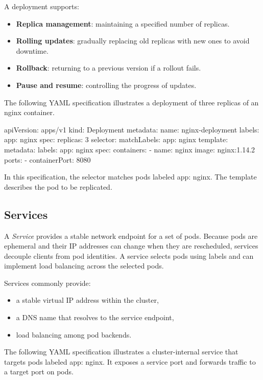 \documentclass[11pt,a4paper,openany]{report}
\begin{document}
A deployment supports:

\begin{itemize}
\item \textbf{Replica management}: maintaining a specified number of replicas.
\item \textbf{Rolling updates}: gradually replacing old replicas with new ones to avoid downtime.
\item \textbf{Rollback}: returning to a previous version if a rollout fails.
\item \textbf{Pause and resume}: controlling the progress of updates.
\end{itemize}

The following YAML specification illustrates a deployment of three replicas of an nginx container.

\begin{codeblock}
apiVersion: apps/v1
kind: Deployment
metadata:
  name: nginx-deployment
  labels:
    app: nginx
spec:
  replicas: 3
  selector:
    matchLabels:
      app: nginx
  template:
    metadata:
      labels:
        app: nginx
    spec:
      containers:
        - name: nginx
          image: nginx:1.14.2
          ports:
            - containerPort: 8080
\end{codeblock}

In this specification, the selector matches pods labeled app: nginx. The template describes the pod to be replicated.

\subsection{Services}

A \emph{Service} provides a stable network endpoint for a set of pods. Because pods are ephemeral and their IP addresses can change when they are rescheduled, services decouple clients from pod identities. A service selects pods using labels and can implement load balancing across the selected pods.

Services commonly provide:

\begin{itemize}
\item a stable virtual IP address within the cluster,
\item a DNS name that resolves to the service endpoint,
\item load balancing among pod backends.
\end{itemize}

The following YAML specification illustrates a cluster-internal service that targets pods labeled app: nginx. It exposes a service port and forwards traffic to a target port on pods.
\end{document}
